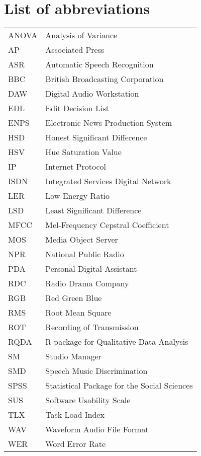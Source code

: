 \chapter*{List of abbreviations}

\begin{tabular}{l l}
ANOVA & Analysis of Variance \\
AP & Associated Press \\
ASR & Automatic Speech Recognition \\
BBC & British Broadcasting Corporation \\
DAW & Digital Audio Workstation \\
EDL & Edit Decision List \\
ENPS & Electronic News Production System \\
HSD & Honest Significant Difference \\
HSV & Hue Saturation Value \\
IP & Internet Protocol \\
ISDN & Integrated Services Digital Network \\
LER & Low Energy Ratio \\
LSD & Least Significant Difference \\
MFCC & Mel-Frequency Cepstral Coefficient \\
MOS & Media Object Server \\
NPR & National Public Radio \\
PDA & Personal Digital Assistant \\
RDC & Radio Drama Company \\
RGB & Red Green Blue \\
RMS & Root Mean Square \\
ROT & Recording of Transmission \\
RQDA & R package for Qualitative Data Analysis \\
SM  & Studio Manager \\
SMD & Speech Music Discrimination \\
SPSS & Statistical Package for the Social Sciences \\
SUS & Software Usability Scale \\
TLX & Task Load Index \\
WAV & Waveform Audio File Format \\
WER & Word Error Rate
\end{tabular}

